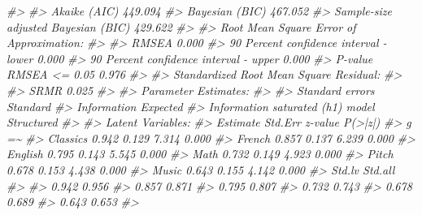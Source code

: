 \documentclass[
  11pt,
]{krantz}
\makeatletter
\newenvironment{Shaded}{\begin{snugshade}}{\end{snugshade}}
\newcommand{\CommentTok}[1]{\textcolor[rgb]{0.37,0.37,0.37}{\textit{#1}}}
\newenvironment{kframe}{%
\medskip{}
\setlength{\fboxsep}{.8em}
 \def\at@end@of@kframe{}%
 \ifinner\ifhmode%
  \def\at@end@of@kframe{\end{minipage}}%
  \begin{minipage}{\columnwidth}%
 \fi\fi%
 \def\FrameCommand##1{\hskip\@totalleftmargin \hskip-\fboxsep
 \colorbox{shadecolor}{##1}\hskip-\fboxsep
     \hskip-\linewidth \hskip-\@totalleftmargin \hskip\columnwidth}%
 \MakeFramed {\advance\hsize-\width
   \@totalleftmargin\z@ \linewidth\hsize
   \@setminipage}}%
 {\par\unskip\endMakeFramed%
 \at@end@of@kframe}
\renewenvironment{Shaded}{\begin{kframe}}{\end{kframe}}
\theoremstyle{definition}
\theoremstyle{definition}
\theoremstyle{definition}
\theoremstyle{definition}
\theoremstyle{remark}
\makeatother
\begin{document}
\begin{Shaded}
\begin{Highlighting}[]
\CommentTok{\#\textgreater{}                                                       }
\CommentTok{\#\textgreater{}   Akaike (AIC)                                 449.094}
\CommentTok{\#\textgreater{}   Bayesian (BIC)                               467.052}
\CommentTok{\#\textgreater{}   Sample{-}size adjusted Bayesian (BIC)          429.622}
\CommentTok{\#\textgreater{} }
\CommentTok{\#\textgreater{} Root Mean Square Error of Approximation:}
\CommentTok{\#\textgreater{} }
\CommentTok{\#\textgreater{}   RMSEA                                          0.000}
\CommentTok{\#\textgreater{}   90 Percent confidence interval {-} lower         0.000}
\CommentTok{\#\textgreater{}   90 Percent confidence interval {-} upper         0.000}
\CommentTok{\#\textgreater{}   P{-}value RMSEA \textless{}= 0.05                          0.976}
\CommentTok{\#\textgreater{} }
\CommentTok{\#\textgreater{} Standardized Root Mean Square Residual:}
\CommentTok{\#\textgreater{} }
\CommentTok{\#\textgreater{}   SRMR                                           0.025}
\CommentTok{\#\textgreater{} }
\CommentTok{\#\textgreater{} Parameter Estimates:}
\CommentTok{\#\textgreater{} }
\CommentTok{\#\textgreater{}   Standard errors                             Standard}
\CommentTok{\#\textgreater{}   Information                                 Expected}
\CommentTok{\#\textgreater{}   Information saturated (h1) model          Structured}
\CommentTok{\#\textgreater{} }
\CommentTok{\#\textgreater{} Latent Variables:}
\CommentTok{\#\textgreater{}                    Estimate  Std.Err  z{-}value  P(\textgreater{}|z|)}
\CommentTok{\#\textgreater{}   g =\textasciitilde{}                                                }
\CommentTok{\#\textgreater{}     Classics          0.942    0.129    7.314    0.000}
\CommentTok{\#\textgreater{}     French            0.857    0.137    6.239    0.000}
\CommentTok{\#\textgreater{}     English           0.795    0.143    5.545    0.000}
\CommentTok{\#\textgreater{}     Math              0.732    0.149    4.923    0.000}
\CommentTok{\#\textgreater{}     Pitch             0.678    0.153    4.438    0.000}
\CommentTok{\#\textgreater{}     Music             0.643    0.155    4.142    0.000}
\CommentTok{\#\textgreater{}    Std.lv  Std.all}
\CommentTok{\#\textgreater{}                   }
\CommentTok{\#\textgreater{}     0.942    0.956}
\CommentTok{\#\textgreater{}     0.857    0.871}
\CommentTok{\#\textgreater{}     0.795    0.807}
\CommentTok{\#\textgreater{}     0.732    0.743}
\CommentTok{\#\textgreater{}     0.678    0.689}
\CommentTok{\#\textgreater{}     0.643    0.653}
\CommentTok{\#\textgreater{} }

\end{Highlighting}
\end{Shaded}
\end{document}
